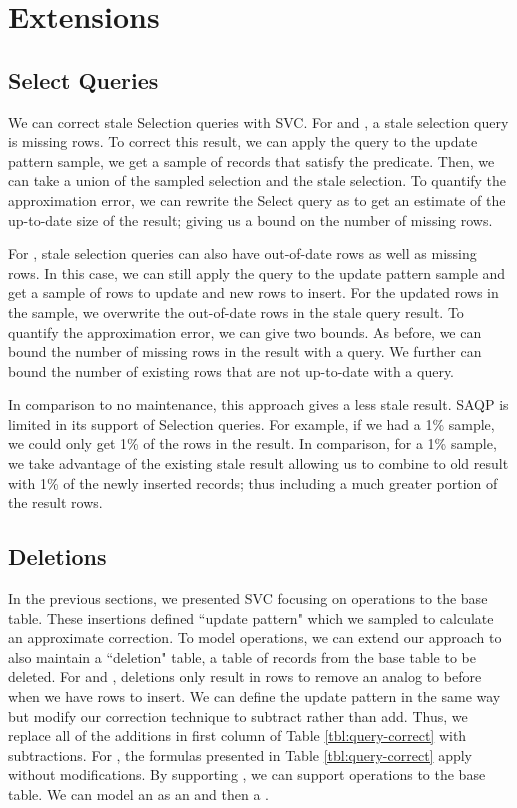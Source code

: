 \section{Extensions}
\subsection{Select Queries}\label{sec:sel}
We can correct stale Selection queries with SVC.
For \fjview and \spview, a stale selection query is missing rows.
To correct this result, we can apply the query to the update pattern sample, we get a sample of records that satisfy the predicate.
Then, we can take a union of the sampled selection and the stale selection.
To quantify the approximation error, we can rewrite the Select query as \countfunc to get an estimate of the up-to-date size of the result; giving us a bound on the number of missing rows.

For \aggview, stale selection queries can also have out-of-date rows as well as missing rows.
In this case, we can still apply the query to the update pattern sample and get a sample of rows to update and new rows to insert.
For the updated rows in the sample, we overwrite the out-of-date rows in the stale query result.
To quantify the approximation error, we can give two bounds.
As before, we can bound the number of missing rows in the result with a \countfunc query.
We further can bound the number of existing rows that are not up-to-date with a \countfunc query.

In comparison to no maintenance, this approach gives a less stale result.
SAQP is limited in its support of Selection queries.
For example, if we had a 1\% sample, we could only get 1\% of the rows in the result.
In comparison, for a 1\% sample, we take advantage of the existing stale result allowing us to combine to old result with 1\% of the newly inserted records; thus including a much greater portion of the result rows.

\subsection{Deletions}\label{sec:del}
In the previous sections, we presented SVC focusing on \insertion operations to the base table.
These insertions defined ``update pattern" which we sampled to calculate an approximate correction.
To model \delete operations, we can extend our approach to also maintain a ``deletion" table, a table of records from the base table to be deleted. 
For \fjview and \spview, deletions only result in rows to remove an analog to before when we have rows to insert.
We can define the update pattern in the same way but modify our correction technique to subtract rather than add.
Thus, we replace all of the additions in first column of Table \ref{tbl:query-correct} with subtractions.
For \aggview, the formulas presented in Table \ref{tbl:query-correct} apply without modifications.
By supporting \delete, we can support \update operations to the base table.
We can model an \update as an \insertion and then a \delete.
